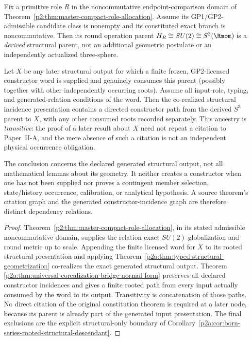 \documentclass[12pt,a4paper]{article}
\begin{document}
\begin{corollary}
\label{p2a:cor:v282-transitive-s3-ancestry}
Fix a primitive role \(R\) in the noncommutative endpoint-comparison domain
of Theorem~\ref{p2:thm:master-compact-role-allocation}.  Assume its
GP1/GP2-admissible candidate class is nonempty and its constituted exact
branch is noncommutative.  Then its round operation parent
\(H_R\cong SU(2)\cong S^3(\Rmom)\) is a \emph{derived} structural parent,
not an additional geometric postulate or an independently actualized
three-sphere.

Let \(X\) be any later structural output for which a finite frozen,
GP2-licensed constructor word is supplied and genuinely consumes this
parent (possibly together with other independently occurring roots).
Assume all input-role, typing, and generated-relation conditions of the
word.  Then the co-realized structural incidence presentation contains
a directed constructor path from the derived \(S^3\) parent to \(X\),
with any other consumed roots recorded separately.  This ancestry is
\emph{transitive}: the proof of a later result about \(X\) need not
repeat a citation to Paper~II-A, and the mere absence of such a citation
is not an independent physical occurrence obligation.

The conclusion concerns the declared generated structural output, not
all mathematical lemmas about its geometry.  It neither creates a
constructor when one has not been supplied nor proves a contingent
member selection, state/history occurrence, calibration, or analytical
hypothesis.  A source theorem's citation graph and the generated
constructor-incidence graph are therefore distinct dependency relations.
\end{corollary}
\begin{proof}
Theorem~\ref{p2:thm:master-compact-role-allocation}, in its stated
admissible noncommutative domain, supplies the relation-exact
\(SU(2)\) globalization and round metric up to scale.  Appending the
finite licensed word for \(X\) to its rooted structural presentation
and applying Theorem~\ref{p2a:thm:typed-structural-geometrization}
co-realizes the exact generated structural output.  Theorem~
\ref{p2a:thm:universal-corealization-bridge-normal-form} preserves
all declared constructor incidences and gives a finite rooted path
from every input actually consumed by the word to its output.
Transitivity is concatenation of those paths.  No direct citation of
the original constitution theorem is required at a later node,
because its parent is already part of the generated input presentation.
The final exclusions are the explicit structural-only boundary of
Corollary~\ref{p2a:cor:born-series-rooted-structural-descendant}.
\end{proof}
\end{document}
